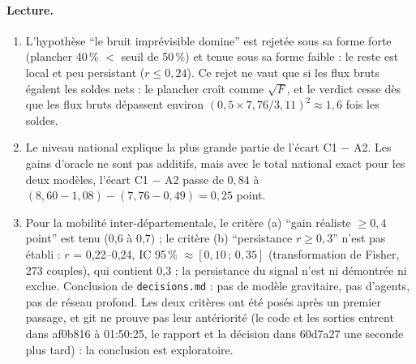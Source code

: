 \paragraph{Lecture.}
\begin{enumerate}
  \item L'hypothèse \enquote{le bruit imprévisible domine} est rejetée sous sa forme forte (plancher 40\,\%
    $<$ seuil de 50\,\%\suppose) et tenue sous sa forme faible : le reste est local et peu persistant
    ($r \le 0{,}24$\mesure). Ce rejet ne vaut que si les flux bruts égalent les soldes nets : le plancher
    croît comme $\sqrt F$, et le verdict cesse dès que les flux bruts dépassent environ
    $(0{,}5 \times 7{,}76/3{,}11)^2 \approx 1{,}6$\derive{} fois les soldes.
  \item Le niveau national explique la plus grande partie de l'écart C1 $-$ A2. Les gains d'oracle ne sont
    pas additifs, mais avec le total national exact pour les deux modèles, l'écart C1 $-$ A2 passe de
    $0{,}84$ à $(8{,}60 - 1{,}08) - (7{,}76 - 0{,}49) = 0{,}25$\derive{} point.
  \item Pour la mobilité inter-départementale, le critère (a) \enquote{gain réaliste $\ge 0{,}4$ point} est
    tenu (0,6 à 0,7\mesure) ; le critère (b) \enquote{persistance $r \ge 0{,}3$} n'est pas établi :
    $r$ = 0,22--0,24\mesure, IC 95\,\% $\approx [0{,}10\,;\,0{,}35]$\derive{} (transformation de Fisher,
    273 couples), qui contient 0,3 ; la persistance du signal n'est ni démontrée ni exclue. Conclusion de \texttt{decisions.md} : pas de modèle gravitaire, pas d'agents, pas
    de réseau profond. Les deux critères ont été posés après un premier passage, et git ne prouve
    pas leur antériorité (le code et les sorties entrent dans af0b816 à 01:50:25\mesure, le rapport et la
    décision dans 60d7a27 une seconde plus tard\mesure) : la conclusion est exploratoire.
\end{enumerate}

